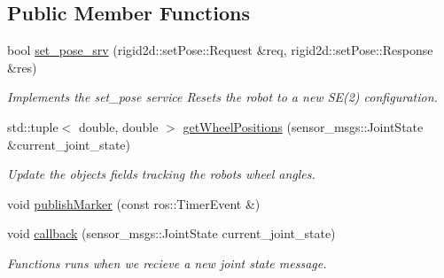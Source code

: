 \subsection*{Public Member Functions}
\begin{DoxyCompactItemize}
\item 
\mbox{\label{classodometer_a72accc63053cf45e591d588e2c5c54b1}} 
bool \hyperlink{classodometer_a72accc63053cf45e591d588e2c5c54b1}{set\+\_\+pose\+\_\+srv} (rigid2d\+::set\+Pose\+::\+Request \&req, rigid2d\+::set\+Pose\+::\+Response \&res)
\begin{DoxyCompactList}\small\item\em Implements the set\+\_\+pose service Resets the robot to a new S\+E(2) configuration. \end{DoxyCompactList}\item 
std\+::tuple$<$ double, double $>$ \hyperlink{classodometer_a246018786026cc9d61b97c80f340e771}{get\+Wheel\+Positions} (sensor\+\_\+msgs\+::\+Joint\+State \&current\+\_\+joint\+\_\+state)
\begin{DoxyCompactList}\small\item\em Update the object\textquotesingle{}s fields tracking the robot\textquotesingle{}s wheel angles. \end{DoxyCompactList}\item 
void \hyperlink{classodometer_a70ae27127c495fde6b970b4ef432b326}{publish\+Marker} (const ros\+::\+Timer\+Event \&)
\item 
void \hyperlink{classodometer_a239d6c3386d056bd69978ae3021c4a55}{callback} (sensor\+\_\+msgs\+::\+Joint\+State current\+\_\+joint\+\_\+state)
\begin{DoxyCompactList}\small\item\em Functions runs when we recieve a new joint state message. \end{DoxyCompactList}\end{DoxyCompactItemize}
